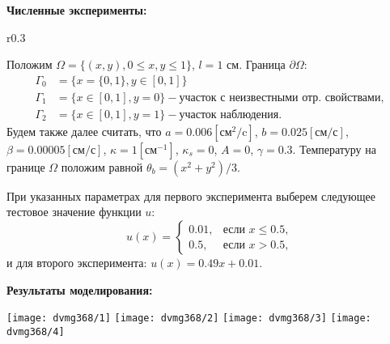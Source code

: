 \begin{frame}
    \textbf{Численные эксперименты:}

    \begin{wrapfigure}{r}{0.3\textwidth}
    \end{wrapfigure}
    Положим $\Omega = \{(x,y), 0 \leq x,y \leq 1\}$, $l = 1$ см.
    Граница $\partial\Omega$:
    \[
        \begin{aligned}
            \Gamma_0 & = \{x=\{0,1\}, y \in [0,1]\} \\
            \Gamma_1 & = \{x\in [0,1], y=0\}
            - \text{участок с неизвестными отр. свойствами}, \\
            \Gamma_2 & = \{x \in [0,1], y=1\} - \text{участок наблюдения}.
        \end{aligned}
    \]
    Будем также далее считать, что $a = 0.006[\text{см}^2/\text{c}]$,
    $b=0.025[\text{см}/\text{с}]$, $\beta = 0.00005[\text{см}/\text{с}]$,
    $\kappa=1[\text{см}^{-1}]$, $\kappa_s = 0$, $A = 0$, $\gamma = 0.3$.
    Температуру на границе $\Omega$ положим равной $\theta_b = (x^2+y^2)/3$.

    При указанных параметрах для первого эксперимента выберем следующее тестовое
    значение функции $u$:
    \begin{equation*}
        u(x)=
        \begin{cases}
            0.01, & \text{если } x \le 0.5, \\
            0.5, & \text{если } x > 0.5,
        \end{cases}
    \end{equation*}
    и для второго эксперимента:
    $u(x)=0.49x+0.01$.
\end{frame}


\begin{frame}
    \textbf{Результаты моделирования:}

    \centering
    \texttt{[image: dvmg368/1]}
    \texttt{[image: dvmg368/2]}
    \texttt{[image: dvmg368/3]}
    \texttt{[image: dvmg368/4]}
\end{frame}

